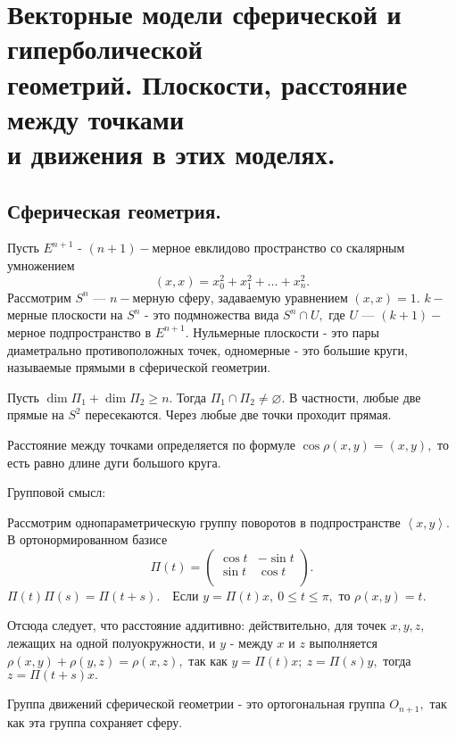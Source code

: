 \documentclass[a4paper]{article}%
\renewcommand{\c}{\mathbb{C}}
\newcommand{\eps}{\varepsilon}
\newcommand{\pr}{{\rm pr\,}}%
\renewcommand{\rk}{{\rm rk\,}}%
\renewcommand{\de}{\par\noindent\underline{Def}.\ }%
\renewcommand{\ab}{\par\noindent}%
\newcommand{\te}{\par\noindent{\bf Теорема.}\ }%
\newcommand{\dok}{\par\noindent{\textsl{Доказательство}.}\ }%
\newcommand{\qed}{\quad${{\bf Q.E.D.}}$}
\renewcommand{\phi}{\varphi}
\newcommand{\sled}{\par\noindent{\bf Следствие.}\ }%
\newcommand{\baz}[1]{\left(#1_1,\dots,#1_n\right)}%
\newcommand{\lr}{\Leftrightarrow}%
\renewcommand{\nn}[1]{#1_1,#1_2,\dots,#1_n}%
\newcommand{\lob}[1]{\left\langle#1\right\rangle}%
\newcommand{\ps}{\oplus}
\newcommand{\rom}[1]{{\rm#1\,}}
\newcommand{\op}[1]{$\mathcal{#1}$}
\renewcommand{\om}[1]{\mathcal{#1}}
\newcommand{\oi}[1]{\overrightarrow{#1}}%
\renewcommand{\le}{\leqslant}
\renewcommand{\ge}{\geqslant}
\newcommand{\we}[1]{\widehat{#1}}
\begin{document}
%

\section{Векторные модели сферической и гиперболической\\ геометрий. Плоскости, расстояние между точками\\ и движения в этих моделях.}
\label{q56}
\subsection{Сферическая геометрия.}
Пусть $E^{n+1}$ - $(n+1)-$мерное евклидово пространство со скалярным умножением $$(x,x)=x_0^2+x_1^2+\dots+x_n^2.$$
Рассмотрим $S^n$ --- $n-$мерную сферу, задаваемую уравнением $(x,x)=1.$ $k-$мерные плоскости на $S^n$ - это
подмножества вида $S^n\cap U,$ где $U$ --- $(k+1)-$мерное подпространство в $E^{n+1}.$ Нульмерные плоскости - это
пары диаметрально противоположных точек, одномерные - это большие круги, называемые прямыми в сферической геометрии.
\ab Пусть $\dim \Pi_1+\dim\Pi_2\ge n.$ Тогда $\Pi_1\cap\Pi_2\ne \varnothing.$ В частности, любые две прямые на $S^2$ пересекаются.
Через любые две точки проходит прямая.
\ab Расстояние между точками определяется по формуле $\cos\rho(x,y)=(x,y),$ то есть равно длине дуги большого круга.
\ab Групповой смысл:
\ab Рассмотрим однопараметрическую группу поворотов в подпространстве $\lob{x,y}.$ В ортонормированном базисе
$$
\Pi(t)=\left(%
\begin{array}{cc}
  \cos t & -\sin t \\
  \sin t & \cos t \\
\end{array}%
\right).
$$
$\Pi(t)\Pi(s)=\Pi(t+s).$\ \ Если $y=\Pi(t)x,\ 0\le t\le\pi,$ то $\rho(x,y)=t.$
\ab Отсюда следует, что расстояние аддитивно: действительно, для точек $x,y,z,$ лежащих на одной полуокружности,
и $y$ - между $x$ и $z$ выполняется $\rho(x,y)+\rho(y,z)=\rho(x,z),$ так как $y=\Pi(t)x;\ z=\Pi(s)y,$ тогда
$z=\Pi(t+s)x.$
\ab Группа движений сферической геометрии - это ортогональная группа $O_{n+1},$ так как эта группа сохраняет сферу.
\end{document}
